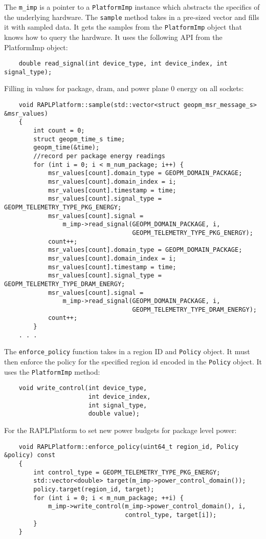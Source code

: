\documentclass[11pt]{article}
\begin{document}
The \verb#m_imp# is a pointer to a \verb#PlatformImp# instance which
abstracts the specifics of the underlying hardware.  The \verb#sample#
method takes in a pre-sized vector and fills it with sampled data. It
gets the samples from the \verb#PlatformImp# object that knows how to
query the hardware. It uses the following API from the PlatformImp
object:
\begin{verbatim}
    double read_signal(int device_type, int device_index, int signal_type);
\end{verbatim}
Filling in values for package, dram, and power plane 0 energy on all
sockets:
\begin{verbatim}
    void RAPLPlatform::sample(std::vector<struct geopm_msr_message_s> &msr_values)
    {
        int count = 0;
        struct geopm_time_s time;
        geopm_time(&time);
        //record per package energy readings
        for (int i = 0; i < m_num_package; i++) {
            msr_values[count].domain_type = GEOPM_DOMAIN_PACKAGE;
            msr_values[count].domain_index = i;
            msr_values[count].timestamp = time;
            msr_values[count].signal_type = GEOPM_TELEMETRY_TYPE_PKG_ENERGY;
            msr_values[count].signal =
                m_imp->read_signal(GEOPM_DOMAIN_PACKAGE, i,
                                   GEOPM_TELEMETRY_TYPE_PKG_ENERGY);
            count++;
            msr_values[count].domain_type = GEOPM_DOMAIN_PACKAGE;
            msr_values[count].domain_index = i;
            msr_values[count].timestamp = time;
            msr_values[count].signal_type = GEOPM_TELEMETRY_TYPE_DRAM_ENERGY;
            msr_values[count].signal =
                m_imp->read_signal(GEOPM_DOMAIN_PACKAGE, i,
                                   GEOPM_TELEMETRY_TYPE_DRAM_ENERGY);
            count++;
        }
    . . .
\end{verbatim}
The \verb#enforce_policy# function takes in a region ID and
\verb#Policy# object. It must then enforce the policy for the
specified region id encoded in the \verb#Policy# object. It uses the
\verb#PlatformImp# method:
\begin{verbatim}
    void write_control(int device_type,
                       int device_index,
                       int signal_type,
                       double value);
\end{verbatim}
For the RAPLPlatform to set new power budgets for package level power:
\begin{verbatim}
    void RAPLPlatform::enforce_policy(uint64_t region_id, Policy &policy) const
    {
        int control_type = GEOPM_TELEMETRY_TYPE_PKG_ENERGY;
        std::vector<double> target(m_imp->power_control_domain());
        policy.target(region_id, target);
        for (int i = 0; i < m_num_package; ++i) {
            m_imp->write_control(m_imp->power_control_domain(), i,
                                 control_type, target[i]);
        }
    }
\end{verbatim}
\end{document}

